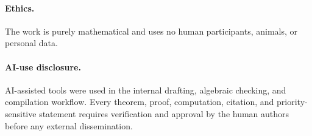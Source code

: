 \paragraph{Ethics.}
The work is purely mathematical and uses no human participants, animals, or
personal data.

\paragraph{AI-use disclosure.}
AI-assisted tools were used in the internal drafting, algebraic checking, and
compilation workflow.  Every theorem, proof, computation, citation, and
priority-sensitive statement requires verification and approval by the human
authors before any external dissemination.
